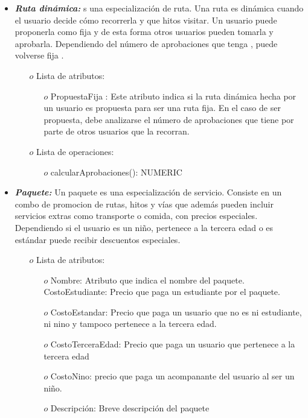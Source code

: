 \documentclass[a4paper]{article}
\begin{document}
\begin{itemize}


\item{	

\textbf{\textit{Ruta dinámica: }}s una especialización de ruta. Una ruta es dinámica cuando el usuario decide cómo recorrerla y que hitos visitar. Un usuario puede proponerla como fija y de esta forma otros usuarios pueden tomarla y aprobarla. Dependiendo del número de aprobaciones que tenga , puede volverse fija .
        
 \begin{itemize}
 
 \item[$o$] Lista de atributos:
 
 \begin{itemize}
\item[$o$]PropuestaFija : Este atributo indica si la ruta dinámica hecha por un usuario es
propuesta para ser una ruta fija. En el caso de ser propuesta, debe analizarse el
número de aprobaciones que tiene por parte de otros usuarios que la recorran. 
\end{itemize}

\item[$o$] Lista de operaciones:

\begin{itemize}
\item[$o$]calcularAprobaciones(): NUMERIC
 \end{itemize}
 
 
 \end{itemize}

 
 }




\item{	

\textbf{\textit{Paquete: }}Un paquete es una especialización de servicio. Consiste en un combo de promocion de rutas, hitos y vías que además pueden incluir servicios extras como transporte o comida, con precios especiales. Dependiendo si el usuario es un niño, pertenece a la tercera edad o es estándar puede recibir descuentos especiales.
 \begin{itemize}
 
 
 
 \item[$o$] Lista de atributos:
 
 \begin{itemize}
\item[$o$]Nombre: Atributo que indica el nombre del paquete. CostoEstudiante: Precio que paga un estudiante por el paquete.
\item[$o$] CostoEstandar: Precio que paga un usuario que no es ni estudiante, ni nino y tampoco pertenece a la tercera edad.
\item[$o$] CostoTerceraEdad: Precio que paga un usuario que pertenece a la tercera edad 
\item[$o$] CostoNino: precio que paga un acompanante del usuario al ser un niño. \item[$o$] Descripción: Breve descripción del paquete 
\end{itemize}


\end{itemize}}
\end{itemize}
\end{document}
